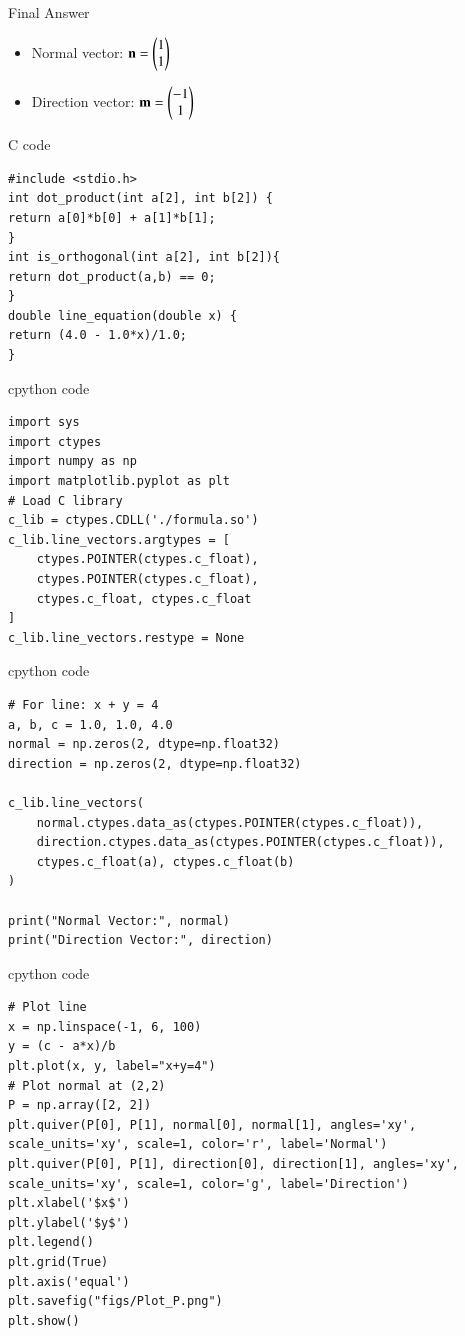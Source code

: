 \documentclass{beamer}
\begin{document}
\begin{frame}{Final Answer}
\begin{itemize}
    \item Normal vector: $\mathbf{n} = \begin{pmatrix}1 \\ 1\end{pmatrix}$
    \item Direction vector: $\mathbf{m} = \begin{pmatrix}-1 \\ 1\end{pmatrix}$
\end{itemize}
\end{frame}

\begin{frame}[fragile]{C code}
\begin{lstlisting}
#include <stdio.h>
int dot_product(int a[2], int b[2]) {
return a[0]*b[0] + a[1]*b[1];
}
int is_orthogonal(int a[2], int b[2]){
return dot_product(a,b) == 0;
}
double line_equation(double x) {
return (4.0 - 1.0*x)/1.0;
}
\end{lstlisting}
\end{frame}

\begin{frame}[fragile]{cpython code}
\begin{lstlisting}
import sys
import ctypes
import numpy as np
import matplotlib.pyplot as plt
# Load C library
c_lib = ctypes.CDLL('./formula.so')
c_lib.line_vectors.argtypes = [
    ctypes.POINTER(ctypes.c_float),  
    ctypes.POINTER(ctypes.c_float),  
    ctypes.c_float, ctypes.c_float
]
c_lib.line_vectors.restype = None  
\end{lstlisting}
\end{frame}

\begin{frame}[fragile]{cpython code}
\begin{lstlisting} 
# For line: x + y = 4
a, b, c = 1.0, 1.0, 4.0
normal = np.zeros(2, dtype=np.float32)
direction = np.zeros(2, dtype=np.float32)

c_lib.line_vectors(
    normal.ctypes.data_as(ctypes.POINTER(ctypes.c_float)),
    direction.ctypes.data_as(ctypes.POINTER(ctypes.c_float)),
    ctypes.c_float(a), ctypes.c_float(b)
)

print("Normal Vector:", normal)
print("Direction Vector:", direction)

\end{lstlisting}
\end{frame}

\begin{frame}[fragile]{cpython code}
\begin{lstlisting}
# Plot line
x = np.linspace(-1, 6, 100)
y = (c - a*x)/b
plt.plot(x, y, label="x+y=4")
# Plot normal at (2,2)
P = np.array([2, 2])
plt.quiver(P[0], P[1], normal[0], normal[1], angles='xy', scale_units='xy', scale=1, color='r', label='Normal')
plt.quiver(P[0], P[1], direction[0], direction[1], angles='xy', scale_units='xy', scale=1, color='g', label='Direction')
plt.xlabel('$x$')
plt.ylabel('$y$')
plt.legend()
plt.grid(True)
plt.axis('equal')
plt.savefig("figs/Plot_P.png")
plt.show()
\end{lstlisting}
\end{frame}
\end{document}

